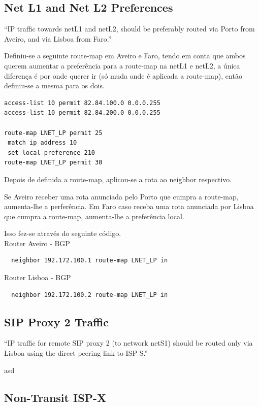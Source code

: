 \documentclass[11pt,a4paper]{report}
\begin{document}
\subsection{Net L1 and Net L2 Preferences}

``IP traffic towards netL1 and netL2, should be preferably routed via Porto from Aveiro, and via Lisboa from Faro.''
\newline

Definiu-se a seguinte route-map em Aveiro e Faro, tendo em conta que ambos querem aumentar a preferência para a route-map na netL1 e netL2, a única diferença é por onde querer ir (só muda onde é aplicada a route-map), então definiu-se a mesma para os dois.
\begin{lstlisting}[caption=Route-map para a netL1 e netL2]
access-list 10 permit 82.84.100.0 0.0.0.255
access-list 10 permit 82.84.200.0 0.0.0.255

route-map LNET_LP permit 25
 match ip address 10
 set local-preference 210
route-map LNET_LP permit 30
\end{lstlisting}

Depois de definida a route-map, aplicou-se a rota ao neighbor respectivo.

Se Aveiro receber uma rota anunciada pelo Porto que cumpra a route-map, aumenta-lhe a perferência. Em Faro caso receba uma rota anunciada por Lisboa que cumpra a route-map, aumenta-lhe a preferência local.

Isso fez-se através do seguinte código.\\
Router Aveiro - BGP
\begin{lstlisting}
  neighbor 192.172.100.1 route-map LNET_LP in
\end{lstlisting}
Router Lisboa - BGP
\begin{lstlisting}
  neighbor 192.172.100.2 route-map LNET_LP in
\end{lstlisting}

\subsection{SIP Proxy 2 Traffic}

``IP traffic for remote SIP proxy 2 (to network netS1) should be routed only via Lisboa using the direct peering link to ISP S.''
\newline

asd

\subsection{Non-Transit ISP-X}
\end{document}
